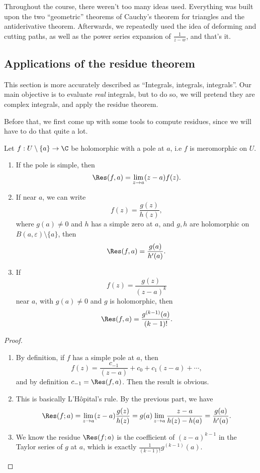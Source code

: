 \documentclass[a4paper]{article}
\begin{document}
Throughout the course, there weren't too many ideas used. Everything was built upon the two ``geometric'' theorems of Cauchy's theorem for triangles and the antiderivative theorem. Afterwards, we repeatedly used the idea of deforming and cutting paths, as well as the power series expansion of $\frac{1}{z - w}$, and that's it.

\subsection{Applications of the residue theorem}
This section is more accurately described as ``Integrals, integrals, integrals''. Our main objective is to evaluate \emph{real} integrals, but to do so, we will pretend they are complex integrals, and apply the residue theorem.

Before that, we first come up with some tools to compute residues, since we will have to do that quite a lot.

\begin{lemma}
  Let $f: U \setminus \{a\} \to \C$ be holomorphic with a pole at $a$, i.e $f$ is meromorphic on $U$.
  \begin{enumerate}
    \item If the pole is simple, then
      \[
        \Res(f, a) = \lim_{z \to a} (z - a) f(z).
      \]
    \item If near $a$, we can write
      \[
        f(z) = \frac{g(z)}{h(z)},
      \]
      where $g(a) \not= 0$ and $h$ has a simple zero at $a$, and $g, h$ are holomorphic on $B(a, \varepsilon) \setminus \{a\}$, then
      \[
        \Res(f, a) = \frac{g(a)}{h'(a)}.
      \]
    \item If
      \[
        f(z) = \frac{g(z)}{(z - a)^k}
      \]
      near $a$, with $g(a) \not= 0$ and $g$ is holomorphic, then
      \[
        \Res(f, a) = \frac{g^{(k - 1)}(a)}{(k - 1)!}.
      \]
  \end{enumerate}
\end{lemma}

\begin{proof}\leavevmode
  \begin{enumerate}
    \item By definition, if $f$ has a simple pole at $a$, then
      \[
        f(z) = \frac{c_{-1}}{(z - a)} + c_0 + c_1(z - a) + \cdots,
      \]
      and by definition $c_{-1} = \Res(f, a)$. Then the result is obvious.
    \item This is basically L'H\^opital's rule. By the previous part, we have
      \[
        \Res(f; a) = \lim_{z \to a} (z - a)\frac{g(z)}{h(z)} = g(a) \lim_{z \to a} \frac{z - a}{h(z) - h(a)} = \frac{g(a)}{h'(a)}.
      \]
    \item We know the residue $\Res(f; a)$ is the coefficient of $(z - a)^{k - 1}$ in the Taylor series of $g$ at $a$, which is exactly $\frac{1}{(k - 1)!} g^{(k - 1)}(a)$.\qedhere
  \end{enumerate}
\end{proof}
\end{document}
